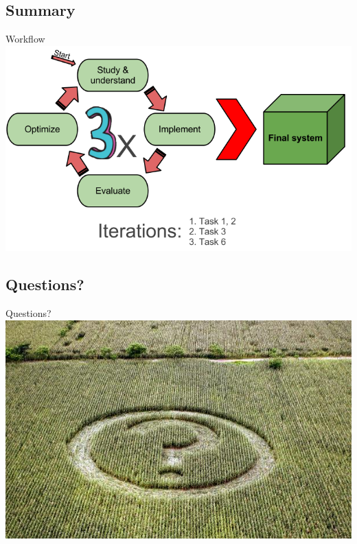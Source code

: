 \documentclass[screen, compress]{beamer}
\begin{document}
\subsection{Summary}
\begin{frame}{Workflow} %
	\includegraphics[width=\textwidth,height=0.7\textheight]{img/summary}
\end{frame}

\subsection{Questions?}
\begin{frame}{Questions?}
\includegraphics[width=\textwidth]{img/any-questions}
\end{frame}
\end{document}
